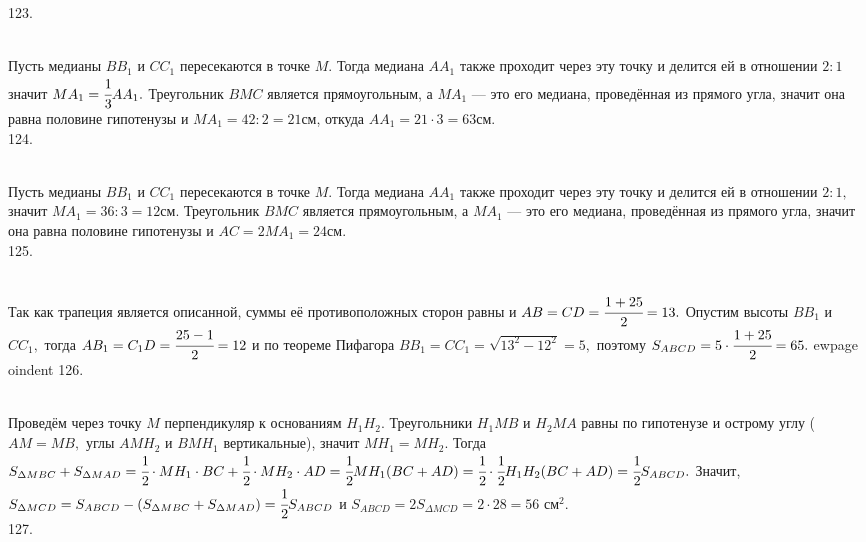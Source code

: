 123. \begin{figure}[ht!]
\end{figure}\\
Пусть медианы $BB_1$ и $CC_1$ пересекаются в точке $M.$ Тогда медиана $AA_1$ также проходит через эту точку и делится ей в отношении $2:1$ значит $MA_1=\cfrac{1}{3}AA_1.$ Треугольник $BMC$ является прямоугольным, а $MA_1$ --- это его медиана, проведённая из прямого угла, значит она равна половине гипотенузы и $MA_1=42:2=21$см, откуда $AA_1=21\cdot3=63$см.\\
124. \begin{figure}[ht!]
\end{figure}\\
Пусть медианы $BB_1$ и $CC_1$ пересекаются в точке $M.$ Тогда медиана $AA_1$ также проходит через эту точку и делится ей в отношении $2:1,$ значит $MA_1=36:3=12$см. Треугольник $BMC$ является прямоугольным, а $MA_1$ --- это его медиана, проведённая из прямого угла, значит она равна половине гипотенузы и $AC=2MA_1=24$см.\\
125. \begin{figure}[ht!]
\end{figure}\\
Так как трапеция является описанной, суммы её противоположных сторон равны и $AB=CD=\cfrac{1+25}{2}=13.$ Опустим высоты $BB_1$ и $CC_1,$ тогда $AB_1=C_1D=\cfrac{25-1}{2}=12$ и по теореме Пифагора $BB_1=CC_1=\sqrt{13^2-12^2}=5,$ поэтому $S_{ABCD}=5\cdot\cfrac{1+25}{2}=65.$
ewpage
oindent
126. \begin{figure}[ht!]
\end{figure}\\
Проведём через точку $M$ перпендикуляр к основаниям $H_1H_2.$ Треугольники $H_1MB$ и $H_2MA$ равны по гипотенузе и острому углу ($AM=MB,$ углы $AMH_2$ и $BMH_1$ вертикальные), значит $MH_1=MH_2.$ Тогда $S_{\Delta MBC}+S_{\Delta MAD}=\cfrac{1}{2}\cdot MH_1\cdot BC+\cfrac{1}{2}\cdot MH_2\cdot AD=\cfrac{1}{2}MH_1(BC+AD)=
\cfrac{1}{2}\cdot\cfrac{1}{2}H_1H_2(BC+AD)=\cfrac{1}{2}S_{ABCD}.$ Значит, $S_{\Delta MCD}=S_{ABCD}-(S_{\Delta MBC}+S_{\Delta MAD})=\cfrac{1}{2}S_{ABCD}$ и $S_{ABCD}=2S_{\Delta MCD}=2\cdot28=56\text{ см}^2.$\\
127. \begin{figure}[ht!]
\end{figure}\\
